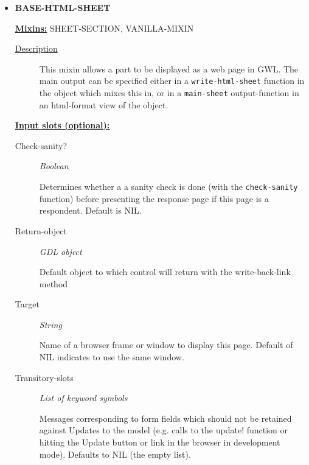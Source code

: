 \documentclass [11pt]{book}
\begin{document}
\begin{itemize}
\item {}
\textbf{BASE-HTML-SHEET}


\textbf{
\underline{Mixins:}} SHEET-SECTION, VANILLA-MIXIN





\begin{description}

\item [
\underline{Description}]


This mixin allows a part to be displayed as a web page in GWL. 
The main output can be specified either in a \texttt{write-html-sheet} function in the object which
mixes  this in, or in a \texttt{main-sheet} output-function in an html-format view of the 
object.



\end{description}








\textbf{
\underline{Input slots (optional):}}

\begin{description}

\item [Check-sanity?]
\emph{Boolean}

 Determines whether a a sanity check is done (with the \texttt{check-sanity} function) before
presenting the response page if this page is a respondent. Default is NIL.




\item [Return-object]
\emph{GDL object}

 Default object to which control will return with the write-back-link method




\item [Target]
\emph{String}

 Name of a browser frame or window to display this page. Default of NIL indicates to use the same window.




\item [Transitory-slots]
\emph{List of keyword symbols}

 Messages corresponding to form fields which should not be retained
against Updates to the model (e.g. calls to the update! function or hitting the Update button or link in
the browser in development mode). Defaults to NIL (the empty list).





\end{description}
\end{itemize}
\end{document}
